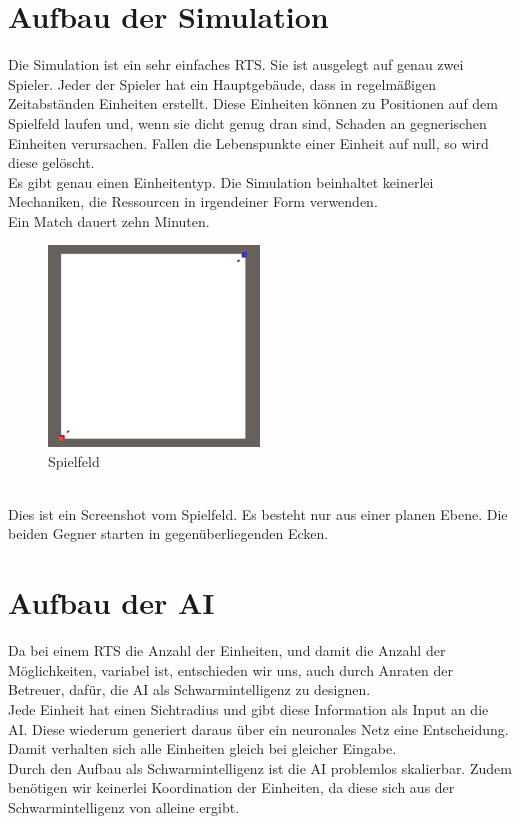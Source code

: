 \documentclass[
	12pt,
	a4paper,
	BCOR10mm,
	DIV14,
	headsepline,
	usegeometry,
]{scrreprt}
\begin{document}
\section{Aufbau der Simulation}
Die Simulation ist ein sehr einfaches RTS. Sie ist ausgelegt auf genau zwei Spieler. Jeder der Spieler hat ein Hauptgebäude, dass in regelmäßigen Zeitabständen Einheiten erstellt. Diese Einheiten können zu Positionen auf dem Spielfeld laufen und, wenn sie dicht genug dran sind, Schaden an gegnerischen Einheiten verursachen. Fallen die Lebenspunkte einer Einheit auf null, so wird diese gelöscht.\\
Es gibt genau einen Einheitentyp. Die Simulation beinhaltet keinerlei Mechaniken, die Ressourcen in irgendeiner Form verwenden.\\
Ein Match dauert zehn Minuten.
\begin{figure}[h]
	\includegraphics[width = 0.5\textwidth]{Spielfeld.png}
	\caption{Spielfeld}
	\label{Spielfeld}
\end{figure}\\
Dies ist ein Screenshot vom Spielfeld. Es besteht nur aus einer planen Ebene. Die beiden Gegner starten in gegenüberliegenden Ecken.

\section{Aufbau der AI}
Da bei einem RTS die Anzahl der Einheiten, und damit die Anzahl der Möglichkeiten, variabel ist, entschieden wir uns, auch durch Anraten der Betreuer, dafür, die AI als Schwarmintelligenz zu designen.\\
Jede Einheit hat einen Sichtradius und gibt diese Information als Input an die AI. Diese wiederum generiert daraus über ein neuronales Netz eine Entscheidung. Damit verhalten sich alle Einheiten gleich bei gleicher Eingabe. \\
Durch den Aufbau als Schwarmintelligenz ist die AI problemlos skalierbar. Zudem benötigen wir keinerlei Koordination der Einheiten, da diese sich aus der Schwarmintelligenz von alleine ergibt.
\end{document}
